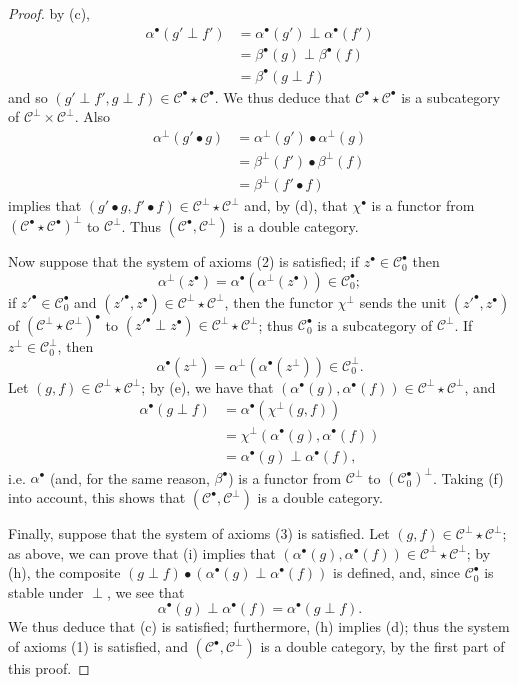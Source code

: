 \documentclass[a4paper,fleqn]{article}
\theoremstyle{plain}
\theoremstyle{definition}
\newcommand{\CC}{\mathcal{C}}
\begin{document}
\begin{proof}
  by (c),
  \[
    \begin{aligned}
      \alpha^\bullet(g'\perp f')
      &= \alpha^\bullet(g')\perp\alpha^\bullet(f')
    \\&= \beta^\bullet(g)\perp\beta^\bullet(f)
    \\&= \beta^\bullet(g\perp f)
    \end{aligned}
  \]
  and so $(g'\perp f',g\perp f)\in\CC^\bullet\star\CC^\bullet$.
  We thus deduce that $\CC^\bullet\star\CC^\bullet$ is a subcategory of $\CC^\perp\times\CC^\perp$.
  Also
  \[
    \begin{aligned}
      \alpha^\perp(g'\bullet g)
      &= \alpha^\perp(g')\bullet\alpha^\perp(g)
    \\&= \beta^\perp(f')\bullet\beta^\perp(f)
    \\&= \beta^\perp(f'\bullet f)
    \end{aligned}
  \]
  implies that $(g'\bullet g,f'\bullet f)\in\CC^\perp\star\CC^\perp$ and, by (d), that $\chi^\bullet$ is a functor from $(\CC^\bullet\star\CC^\bullet)^\perp$ to $\CC^\perp$.
  Thus $(\CC^\bullet,\CC^\perp)$ is a double category.

  Now suppose that the system of axioms (2) is satisfied;
  if $z^\bullet\in\CC_0^\bullet$ then
  \[
    \alpha^\perp(z^\bullet)
    =\alpha^\bullet(\alpha^\perp(z^\bullet))
    \in\CC_0^\bullet;
  \]
  if $z'^\bullet\in\CC_0^\bullet$ and $(z'^\bullet,z^\bullet)\in\CC^\perp\star\CC^\perp$, then the functor $\chi^\perp$ sends the unit $(z'^\bullet,z^\bullet)$ of $(\CC^\perp\star\CC^\perp)^\bullet$ to $(z'^\bullet\perp z^\bullet)\in\CC^\perp\star\CC^\perp$;
  thus $\CC_0^\bullet$ is a subcategory of $\CC^\perp$.
  If $z^\perp\in\CC_0^\perp$, then
  \[
    \alpha^\bullet(z^\perp)
    = \alpha^\perp(\alpha^\bullet(z^\perp))
    \in \CC_0^\perp.
  \]
  Let $(g,f)\in\CC^\perp\star\CC^\perp$;
  by (e), we have that $(\alpha^\bullet(g),\alpha^\bullet(f))\in\CC^\perp\star\CC^\perp$, and
  \[
    \begin{aligned}
      \alpha^\bullet(g\perp f)
      &= \alpha^\bullet(\chi^\perp(g,f))
    \\&= \chi^\perp(\alpha^\bullet(g),\alpha^\bullet(f))
    \\&= \alpha^\bullet(g)\perp\alpha^\bullet(f),
    \end{aligned}
  \]
  i.e. $\alpha^\bullet$ (and, for the same reason, $\beta^\bullet$) is a functor from $\CC^\perp$ to $(\CC_0^\bullet)^\perp$.
  Taking (f) into account, this shows that $(\CC^\bullet,\CC^\perp)$ is a double category.

  Finally, suppose that the system of axioms (3) is satisfied.
  Let $(g,f)\in\CC^\perp\star\CC^\perp$;
  as above, we can prove that (i) implies that $(\alpha^\bullet(g),\alpha^\bullet(f))\in\CC^\perp\star\CC^\perp$;
  by (h), the composite $(g\perp f)\bullet(\alpha^\bullet(g)\perp\alpha^\bullet(f))$ is defined, and, since $\CC_0^\bullet$ is stable under $\perp$, we see that
  \[
    \alpha^\bullet(g)\perp\alpha^\bullet(f)
    = \alpha^\bullet(g\perp f).
  \]
  We thus deduce that (c) is satisfied;
  furthermore, (h) implies (d);
  thus the system of axioms (1) is satisfied, and $(\CC^\bullet,\CC^\perp)$ is a double category, by the first part of this proof.
\end{proof}
\end{document}
